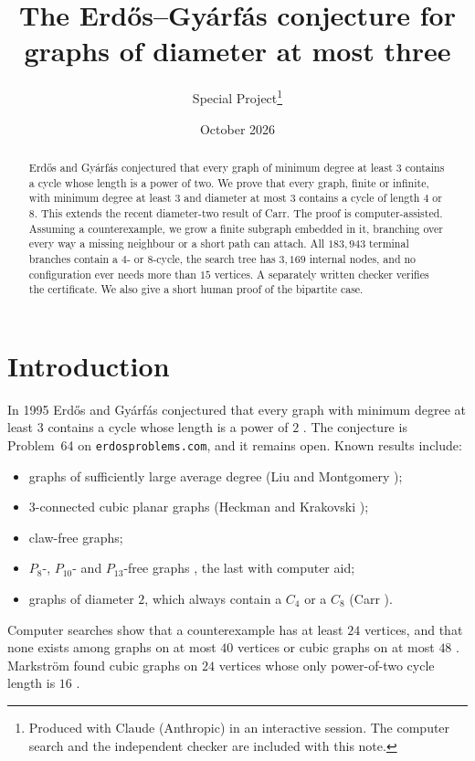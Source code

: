 \documentclass[11pt]{article}
\title{The Erd\H{o}s--Gy\'arf\'as conjecture for graphs of diameter at most three}
\author{Special Project\thanks{Produced with Claude (Anthropic) in an interactive session. The computer
search and the independent checker are included with this note.}}
\date{October 2026}
\theoremstyle{remark}
\begin{document}
\maketitle

\begin{abstract}
Erd\H{o}s and Gy\'arf\'as conjectured that every graph of minimum degree at least $3$ contains a cycle
whose length is a power of two. We prove that every graph, finite or infinite, with minimum degree at
least $3$ and diameter at most $3$ contains a cycle of length $4$ or $8$. This extends the recent
diameter-two result of Carr. The proof is computer-assisted. Assuming a counterexample, we grow a
finite subgraph embedded in it, branching over every way a missing neighbour or a short path can
attach. All $183{,}943$ terminal branches contain a $4$- or $8$-cycle, the search tree has $3{,}169$
internal nodes, and no configuration ever needs more than $15$ vertices. A separately written
checker verifies the certificate. We also give a short human proof of the bipartite case.
\end{abstract}

\section{Introduction}

In 1995 Erd\H{o}s and Gy\'arf\'as conjectured that every graph with minimum degree at least $3$
contains a cycle whose length is a power of $2$ \cite{erdos}. The conjecture is Problem~64 on
\texttt{erdosproblems.com}, and it remains open. Known results include:
\begin{itemize}
\item graphs of sufficiently large average degree (Liu and Montgomery \cite{liumontgomery});
\item $3$-connected cubic planar graphs (Heckman and Krakovski \cite{hk});
\item claw-free graphs;
\item $P_8$-, $P_{10}$- and $P_{13}$-free graphs \cite{gaoshan,hushen,hss}, the last with computer aid;
\item graphs of diameter $2$, which always contain a $C_4$ or a $C_8$ (Carr \cite{carr}).
\end{itemize}
Computer searches show that a counterexample has at least $24$ vertices, and that none exists among
graphs on at most $40$ vertices or cubic graphs on at most $48$ \cite{dd,small}. Markstr\"om found
cubic graphs on $24$ vertices whose only power-of-two cycle length is $16$ \cite{markstrom}.
\end{document}
